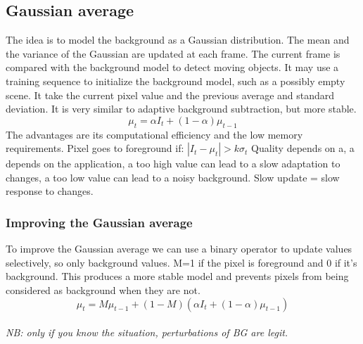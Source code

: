 \subsection{Gaussian average}
The idea is to model the background as a Gaussian distribution. The mean and the variance of the Gaussian are updated at each frame. The current frame is compared with the background model to detect moving objects.
It may use a training sequence to initialize the background model, such as a possibly empty scene.
It take the current pixel value and the previous average and standard deviation. It is very similar to adaptive background subtraction, but more stable.
\[
    \mu_{t} = \alpha I_t + (1-\alpha)\mu_{t-1}
\]
The advantages are its computational efficiency and the low memory requirements.
Pixel goes to foreground if: $|I_t - \mu_t| > k \sigma_t$
Quality depends on a, a depends on the application, a too high value can lead to a slow adaptation to changes, a too low value can lead to a noisy background. Slow update = slow response to changes.
\subsubsection{Improving the Gaussian average}
To improve the Gaussian average we can use a binary operator to update values selectively, so only background values. M=1 if the pixel is foreground and 0 if it's background. This produces a more stable model and prevents pixels from being considered as background when they are not.
\[
    \mu_{t} = M\mu_{t-1} + (1-M)(\alpha I_t + (1-\alpha)\mu_{t-1})
\]
\\\textit{NB: only if you know the situation, perturbations of BG are legit.}
